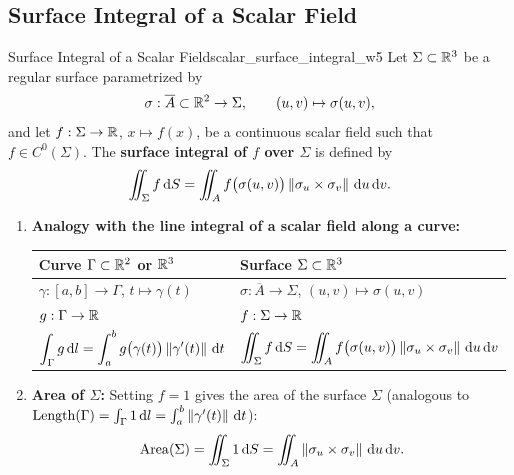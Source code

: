 \subsection{Surface Integral of a Scalar Field}

\begin{definition}{Surface Integral of a Scalar Field}{scalar_surface_integral_w5}
Let $\Sigma \subset \mathbb{R}^3$ be a regular surface parametrized by
\[
    \sigma : \overline{A} \subset \mathbb{R}^2 \to \Sigma, \qquad (u,v) \mapsto \sigma(u,v),
\]
and let $f : \Sigma \to \mathbb{R}$, $x \mapsto f(x)$, be a continuous scalar field such that $f \in C^0(\Sigma)$. The \textbf{surface integral of $f$ over $\Sigma$} is defined by
\[
    \iint_{\Sigma} f \,\mathrm{d}S = \iint_{A} f\big(\sigma(u,v)\big) \left\lVert\sigma_u \times \sigma_v\right\rVert \,\mathrm{d} u\,\mathrm{d} v.
\]
\end{definition}

\begin{remarque}
\begin{enumerate}[label=\textbf{\alph*)}]
    \item \textbf{Analogy with the line integral of a scalar field along a curve:}
    \begin{center}
    \renewcommand{\arraystretch}{1.4}
    \begin{tabular}{@{}ll@{}}
        \toprule
        \textbf{Curve $\Gamma \subset \mathbb{R}^2$ or $\mathbb{R}^3$} & \textbf{Surface $\Sigma \subset \mathbb{R}^3$} \\
        \midrule
        $\gamma : [a,b] \to \Gamma$, $t \mapsto \gamma(t)$ & $\sigma : \overline{A} \to \Sigma$, $(u,v) \mapsto \sigma(u,v)$ \\
        $g : \Gamma \to \mathbb{R}$ & $f : \Sigma \to \mathbb{R}$ \\
        $\displaystyle \int_{\Gamma} g \,\mathrm{d} l = \int_{a}^{b} g\big(\gamma(t)\big) \left\lVert\gamma'(t)\right\rVert \,\mathrm{d}t$ & $\displaystyle \iint_{\Sigma} f \,\mathrm{d}S = \iint_{A} f\big(\sigma(u,v)\big) \left\lVert\sigma_u \times \sigma_v\right\rVert \,\mathrm{d} u\,\mathrm{d} v$ \\
        \bottomrule
    \end{tabular}
    \end{center}
    \item \textbf{Area of $\Sigma$:} Setting $f = 1$ gives the area of the surface $\Sigma$ (analogous to $\operatorname{Length}(\Gamma) = \int_{\Gamma} 1 \,\mathrm{d} l = \int_{a}^{b} \left\lVert\gamma'(t)\right\rVert \,\mathrm{d}t$):
    \[
        \operatorname{Area}(\Sigma) = \iint_{\Sigma} 1 \,\mathrm{d}S = \iint_{A} \left\lVert\sigma_u \times \sigma_v\right\rVert \,\mathrm{d} u\,\mathrm{d} v.
    \]
\end{enumerate}
\end{remarque}